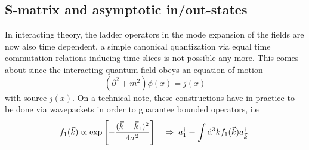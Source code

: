 \subsection{S-matrix and asymptotic in/out-states}
In interacting theory, the ladder operators in the mode expansion of the fields are now also time dependent, a simple canonical quantization via equal time commutation relations inducing time slices is not possible any more. This comes about since the interacting quantum field obeys an equation of motion 
\begin{equation}
	(\partial^2+m^2)\phi(x)=j(x)
\end{equation}
with source $j(x)$. On a technical note, these constructions have in practice to be done via wavepackets in order to guarantee bounded operators, i.e
 \begin{equation*}
 f_1(\vec{k}) \propto \exp\left[-\frac{(\vec{k}-\vec{k}_1)^2}{4 \sigma^2}\right] \quad \Rightarrow \; a^\dagger_1 \equiv \int \mathrm{d}^3 k f_1(\vec{k}) a^\dagger_{\vec{k}}.
 \end{equation*}
